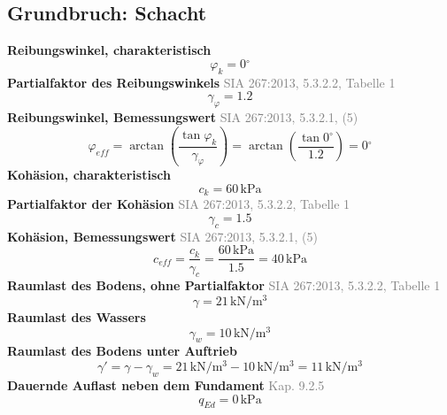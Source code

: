 \documentclass[11pt,a4paper]{article}
\newcommand{\normref}[1]{{\small\textcolor{gray}{#1}}}
\begin{document}
\subsection{Grundbruch: Schacht}
\noindent\textbf{Reibungswinkel, charakteristisch}
\begin{equation*}
\varphi_k = 0{}^{\circ}
\end{equation*}
\noindent\textbf{Partialfaktor des Reibungswinkels} \hfill \normref{SIA 267:2013, 5.3.2.2, Tabelle 1}
\begin{equation*}
\gamma_{\varphi} = 1.2
\end{equation*}
\noindent\textbf{Reibungswinkel, Bemessungswert} \hfill \normref{SIA 267:2013, 5.3.2.1, (5)}
\begin{equation*}
\varphi_{eff} = \arctan\left(\frac{\tan \varphi_k}{\gamma_{\varphi}}\right) = \arctan\left(\frac{\tan 0{}^{\circ}}{1.2}\right) = 0{}^{\circ}
\end{equation*}
\noindent\textbf{Kohäsion, charakteristisch}
\begin{equation*}
c_k = 60\,\mathrm{kPa}
\end{equation*}
\noindent\textbf{Partialfaktor der Kohäsion} \hfill \normref{SIA 267:2013, 5.3.2.2, Tabelle 1}
\begin{equation*}
\gamma_c = 1.5
\end{equation*}
\noindent\textbf{Kohäsion, Bemessungswert} \hfill \normref{SIA 267:2013, 5.3.2.1, (5)}
\begin{equation*}
c_{eff} = \frac{c_k}{\gamma_c} = \frac{60\,\mathrm{kPa}}{1.5} = 40\,\mathrm{kPa}
\end{equation*}
\noindent\textbf{Raumlast des Bodens, ohne Partialfaktor} \hfill \normref{SIA 267:2013, 5.3.2.2, Tabelle 1}
\begin{equation*}
\gamma = 21\,\mathrm{kN}/\mathrm{m}^{3}
\end{equation*}
\noindent\textbf{Raumlast des Wassers}
\begin{equation*}
\gamma_w = 10\,\mathrm{kN}/\mathrm{m}^{3}
\end{equation*}
\noindent\textbf{Raumlast des Bodens unter Auftrieb}
\begin{equation*}
\gamma' = \gamma - \gamma_w = 21\,\mathrm{kN}/\mathrm{m}^{3} - 10\,\mathrm{kN}/\mathrm{m}^{3} = 11\,\mathrm{kN}/\mathrm{m}^{3}
\end{equation*}
\noindent\textbf{Dauernde Auflast neben dem Fundament} \hfill \normref{Kap. 9.2.5}
\begin{equation*}
q_{Ed} = 0\,\mathrm{kPa}
\end{equation*}
\end{document}
